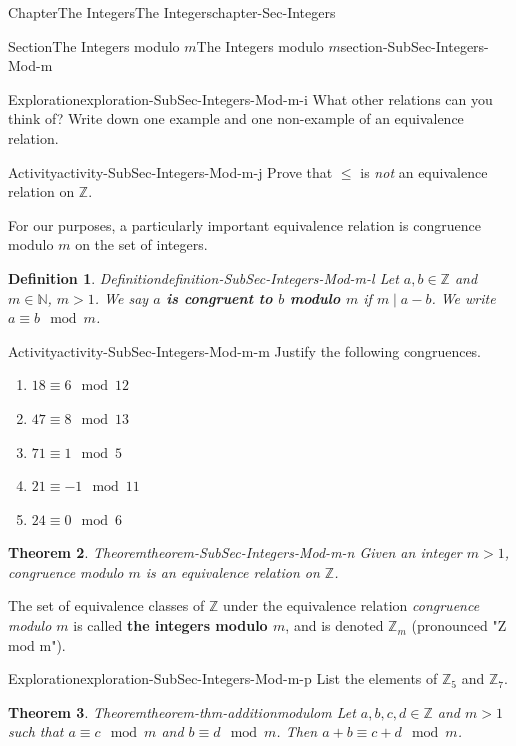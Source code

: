 \documentclass[oneside,10pt,]{book}
\newcommand{\terminology}[1]{\textbf{#1}}
\numberwithin{equation}{section}
\renewcommand{\le}{\leqslant}
\def\Z{{\mathbb Z}}
\def\N{{\mathbb N}}
\newtheorem{theorem}{Theorem}[section]
\newtheorem{definition}[theorem]{Definition}
\begin{document}
\begin{chapterptx}{Chapter}{The Integers}{}{The Integers}{}{}{chapter-Sec-Integers}
\begin{sectionptx}{Section}{The Integers modulo \(m\)}{}{The Integers modulo \(m\)}{}{}{section-SubSec-Integers-Mod-m}
\begin{exploration}{Exploration}{}{exploration-SubSec-Integers-Mod-m-i}%
What other relations can you think of? Write down one example and one non-example of an equivalence relation.%
\end{exploration}%
\begin{activity}{Activity}{}{activity-SubSec-Integers-Mod-m-j}%
Prove that \(\le\) is \emph{not} an equivalence relation on \(\Z\).%
\end{activity}%
For our purposes, a particularly important equivalence relation is congruence modulo \(m\) on the set of integers.%
\begin{definition}{Definition}{}{definition-SubSec-Integers-Mod-m-l}%
%
Let \(a,b\in \Z\) and \(m \in \N\), \(m > 1\). We say \terminology{\(a\) is congruent to \(b\) modulo \(m\)} if \(m\mid a-b\). We write \(a \equiv b\mod m\).%
\end{definition}
\begin{activity}{Activity}{}{activity-SubSec-Integers-Mod-m-m}%
Justify the following congruences.%
\begin{enumerate}
\item{}\(\displaystyle 18 \equiv 6\mod 12\)%
\item{}\(\displaystyle 47 \equiv 8\mod 13\)%
\item{}\(\displaystyle 71 \equiv 1\mod 5\)%
\item{}\(\displaystyle 21 \equiv -1 \mod 11\)%
\item{}\(\displaystyle 24 \equiv 0\mod 6\)%
\end{enumerate}
%
\end{activity}%
\begin{theorem}{Theorem}{}{}{theorem-SubSec-Integers-Mod-m-n}%
Given an integer \(m > 1\), congruence modulo \(m\) is an equivalence relation on \(\Z\).%
\end{theorem}
\index{\(\Z_m\)} The set of equivalence classes of \(\Z\) under the equivalence relation \emph{congruence modulo \(m\)} is called \terminology{the integers modulo \(m\)}, and is denoted \(\Z_m\) (pronounced "Z mod m").%
\begin{exploration}{Exploration}{}{exploration-SubSec-Integers-Mod-m-p}%
List the elements of \(\Z_5\) and \(\Z_7\).%
\end{exploration}%
\begin{theorem}{Theorem}{}{}{theorem-thm-additionmodulom}%
Let \(a,b, c,d\in \Z\) and \(m > 1\) such that \(a\equiv c\mod m\) and \(b\equiv d\mod m\). Then \(a+b \equiv c + d \mod m\).%

\end{theorem}
\end{sectionptx}
\end{chapterptx}
\end{document}
